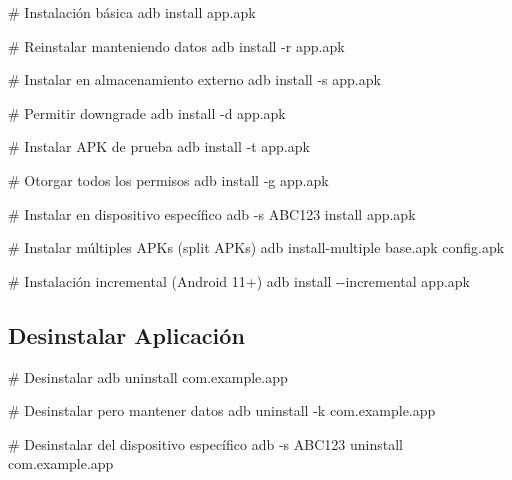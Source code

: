 \documentclass[
  doc,
  floatsintext,
  longtable,
  a4paper,
  nolmodern,
  notxfonts,
  notimes,
  12pt,
  colorlinks=true,linkcolor=blue,citecolor=blue,urlcolor=blue]{apa7}
\newenvironment{Shaded}{\begin{snugshade}}{\end{snugshade}}
\newcommand{\AttributeTok}[1]{\textcolor[rgb]{0.40,0.45,0.13}{#1}}
\newcommand{\CommentTok}[1]{\textcolor[rgb]{0.37,0.37,0.37}{#1}}
\newcommand{\ExtensionTok}[1]{\textcolor[rgb]{0.00,0.23,0.31}{#1}}
\newcommand{\NormalTok}[1]{\textcolor[rgb]{0.00,0.23,0.31}{#1}}
\begin{document}
\begin{Shaded}
\begin{Highlighting}[]
\CommentTok{\# Instalación básica}
\ExtensionTok{adb}\NormalTok{ install app.apk}

\CommentTok{\# Reinstalar manteniendo datos}
\ExtensionTok{adb}\NormalTok{ install }\AttributeTok{{-}r}\NormalTok{ app.apk}

\CommentTok{\# Instalar en almacenamiento externo}
\ExtensionTok{adb}\NormalTok{ install }\AttributeTok{{-}s}\NormalTok{ app.apk}

\CommentTok{\# Permitir downgrade}
\ExtensionTok{adb}\NormalTok{ install }\AttributeTok{{-}d}\NormalTok{ app.apk}

\CommentTok{\# Instalar APK de prueba}
\ExtensionTok{adb}\NormalTok{ install }\AttributeTok{{-}t}\NormalTok{ app.apk}

\CommentTok{\# Otorgar todos los permisos}
\ExtensionTok{adb}\NormalTok{ install }\AttributeTok{{-}g}\NormalTok{ app.apk}

\CommentTok{\# Instalar en dispositivo específico}
\ExtensionTok{adb} \AttributeTok{{-}s}\NormalTok{ ABC123 install app.apk}

\CommentTok{\# Instalar múltiples APKs (split APKs)}
\ExtensionTok{adb}\NormalTok{ install{-}multiple base.apk config.apk}

\CommentTok{\# Instalación incremental (Android 11+)}
\ExtensionTok{adb}\NormalTok{ install }\AttributeTok{{-}{-}incremental}\NormalTok{ app.apk}
\end{Highlighting}
\end{Shaded}

\subsection{Desinstalar Aplicación}\label{desinstalar-aplicaciuxf3n}

\begin{Shaded}
\begin{Highlighting}[]
\CommentTok{\# Desinstalar}
\ExtensionTok{adb}\NormalTok{ uninstall com.example.app}

\CommentTok{\# Desinstalar pero mantener datos}
\ExtensionTok{adb}\NormalTok{ uninstall }\AttributeTok{{-}k}\NormalTok{ com.example.app}

\CommentTok{\# Desinstalar del dispositivo específico}
\ExtensionTok{adb} \AttributeTok{{-}s}\NormalTok{ ABC123 uninstall com.example.app}
\end{Highlighting}
\end{Shaded}
\end{document}
